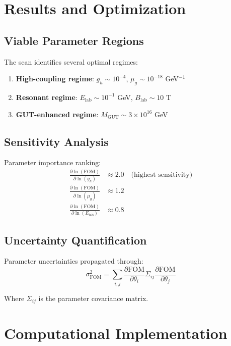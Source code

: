 \documentclass[11pt]{article}
\begin{document}
\section{Results and Optimization}

\subsection{Viable Parameter Regions}

The scan identifies several optimal regimes:

\begin{enumerate}
    \item \textbf{High-coupling regime}: $g_h \sim 10^{-4}$, $\mu_g \sim 10^{-18}$ GeV$^{-1}$
    \item \textbf{Resonant regime}: $E_{\text{lab}} \sim 10^{-1}$ GeV, $B_{\text{lab}} \sim 10$ T
    \item \textbf{GUT-enhanced regime}: $M_{\text{GUT}} \sim 3 \times 10^{16}$ GeV
\end{enumerate}

\subsection{Sensitivity Analysis}

Parameter importance ranking:
\begin{align}
\frac{\partial \ln(\text{FOM})}{\partial \ln(g_h)} &\approx 2.0 \quad \text{(highest sensitivity)} \\
\frac{\partial \ln(\text{FOM})}{\partial \ln(\mu_g)} &\approx 1.2 \\
\frac{\partial \ln(\text{FOM})}{\partial \ln(E_{\text{lab}})} &\approx 0.8
\end{align}

\subsection{Uncertainty Quantification}

Parameter uncertainties propagated through:
\begin{equation}
\sigma_{\text{FOM}}^2 = \sum_{i,j} \frac{\partial \text{FOM}}{\partial \theta_i} \Sigma_{ij} \frac{\partial \text{FOM}}{\partial \theta_j}
\end{equation}

Where $\Sigma_{ij}$ is the parameter covariance matrix.

\section{Computational Implementation}
\end{document}
